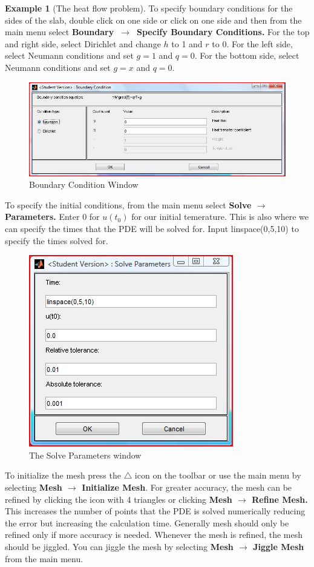 \documentclass{amsart}
\theoremstyle{definition}
\newtheorem{example}{Example}
\begin{document}
\begin{example}[The heat flow problem]
To specify boundary conditions for the sides of the slab, double click on one side or click on one side and then from the main menu select  \textbf{Boundary~$\to$~Specify Boundary Conditions.} For the top and right side, select Dirichlet and change $h$ to 1 and $r$ to 0. For the left side, select Neumann conditions and set $g = 1$ and $q = 0$. For the bottom side, select Neumann conditions and set $g = x$ and $q = 0$. 

\begin{figure}[ht]
   \includegraphics[height = 1.5 in]{BoundaryConditionWindow}
   \caption{Boundary Condition Window}
\end{figure}

\pagebreak

To specify the initial conditions, from the main menu select \textbf{Solve $\to$ Parameters.} Enter 0 for $u(t_0)$ for our initial temerature. This is also where we can specify the times that the PDE will be solved for. Input  linspace(0,5,10) to specify the times solved for.

\begin{figure}[ht]
   \includegraphics[height = 2 in]{SolveParametersWindow}
   \caption{The Solve Parameters window}
\end{figure}

To initialize the mesh press the $\triangle$ icon on the toolbar or use the main menu by selecting \textbf{Mesh $\to$ Initialize Mesh}. For greater accuracy, the mesh can be refined by clicking the icon with 4 triangles or clicking \textbf{Mesh $\to$ Refine Mesh.} This increases the number of points that the PDE is solved numerically reducing the error but increasing the calculation time. Generally mesh should only be refined only if more accuracy is needed. Whenever the mesh is refined, the mesh should be jiggled. You can jiggle the mesh by selecting \textbf{Mesh $\to$ Jiggle Mesh} from the main menu.


\end{example}
\end{document}
